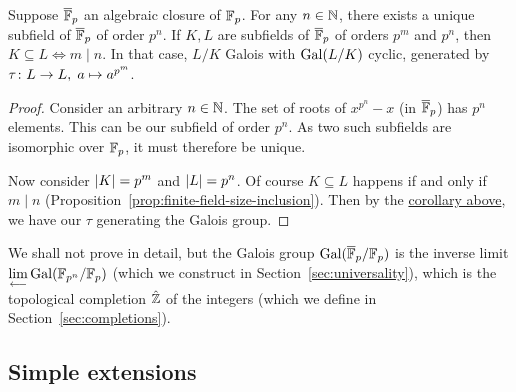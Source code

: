 \begin{theorem}
    Suppose \(\overline{\mathbb{F}}_p\) an algebraic closure of \(\mathbb{F}_p\).
    For any \(n \in \mathbb{N}\),
    there exists a unique subfield of \(\overline{\mathbb{F}}_p\) of order \(p^n\).
    If \(K,L\) are subfields of \(\overline{\mathbb{F}}_p\) of orders \(p^m\) and \(p^n\),
    then \(K \subseteq L \iff m \mid n\).
    In that case, \(L/K\) Galois with \(\operatorname{Gal}(L/K)\) cyclic,
    generated by \(\tau\colon L\to L,\;a\mapsto a^{p^m}\).
\end{theorem}
\begin{proof}
    Consider an arbitrary \(n \in \mathbb{N}\).
    The set of roots of \(x^{p^n} - x\) (in \(\overline{\mathbb{F}}_p\)) has \(p^n\) elements.
    This can be our subfield of order \(p^n\).
    As two such subfields are isomorphic over \(\mathbb{F}_p\), it must therefore be unique.

    Now consider \(\abs{K} = p^m\) and \(\abs{L} = p^n\).
    Of course \(K \subseteq L\) happens if and only if \(m \mid n\)
    (Proposition~\ref{prop:finite-field-size-inclusion}).
    Then by the \hyperref[cor:cyclic-galois-frobenius]{corollary above},
    we have our \(\tau\) generating the Galois group.
\end{proof}

\begin{remark}
    We shall not prove in detail, but the Galois group \(\operatorname{Gal}(\overline{\mathbb{F}}_p/\mathbb{F}_p)\)
    is the inverse limit \(\operatorname{\displaystyle\lim_{\longleftarrow}} \operatorname{Gal}(\mathbb{F}_{p^n}/\mathbb{F}_p)\) (which we construct in Section~\ref{sec:universality}),
    which is the topological completion \(\hat{\mathbb{Z}}\) of the integers (which we define in Section~\ref{sec:completions}).
\end{remark}

\subsection*{Simple extensions}

